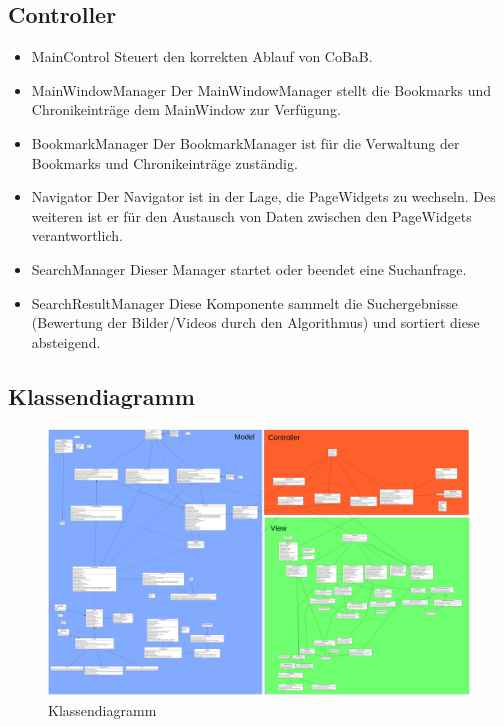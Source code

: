 \subsection*{Controller}
\begin{itemize}
\item MainControl \newline
Steuert den korrekten Ablauf von CoBaB.

\item MainWindowManager \newline
Der MainWindowManager stellt die Bookmarks und Chronikeinträge dem MainWindow zur Verfügung.

\item BookmarkManager \newline
Der BookmarkManager ist für die Verwaltung der Bookmarks und Chronikeinträge zuständig.

\item Navigator \newline
Der Navigator ist in der Lage, die PageWidgets zu wechseln. Des weiteren ist er für den Austausch von Daten zwischen den PageWidgets verantwortlich.

\item SearchManager \newline
Dieser Manager startet oder beendet eine Suchanfrage.

\item SearchResultManager \newline
Diese Komponente sammelt die Suchergebnisse (Bewertung der Bilder/Videos durch den Algorithmus) und sortiert diese absteigend.
\end{itemize}
\pagebreak


\subsection{Klassendiagramm}

\begin{figure}[H]
	\includegraphics[width=1\linewidth]{img/Klassendiagramm/Complete}
	\caption{Klassendiagramm}
	\label{fig:klassendiagramm}
\end{figure}


